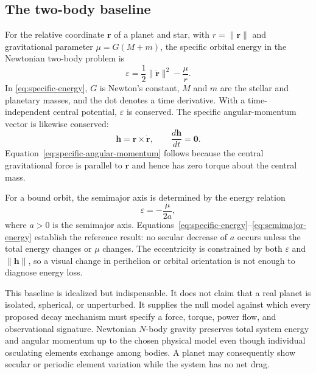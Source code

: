 \documentclass[10pt,conference]{IEEEtran}
\begin{document}
\subsection{The two-body baseline}

For the relative coordinate $\mathbf{r}$ of a planet and star, with $r=\lVert\mathbf{r}\rVert$ and gravitational parameter $\mu=G(M+m)$, the specific orbital energy in the Newtonian two-body problem is
\begin{equation}
\varepsilon=\frac{1}{2}\lVert\dot{\mathbf{r}}\rVert^2-\frac{\mu}{r}.
\label{eq:specific-energy}
\end{equation}
In \eqref{eq:specific-energy}, $G$ is Newton's constant, $M$ and $m$ are the stellar and planetary masses, and the dot denotes a time derivative. With a time-independent central potential, $\varepsilon$ is conserved. The specific angular-momentum vector is likewise conserved:
\begin{equation}
\mathbf{h}=\mathbf{r}\times\dot{\mathbf{r}}, \qquad \frac{d\mathbf{h}}{dt}=\mathbf{0}.
\label{eq:specific-angular-momentum}
\end{equation}
Equation~\eqref{eq:specific-angular-momentum} follows because the central gravitational force is parallel to $\mathbf{r}$ and hence has zero torque about the central mass.

For a bound orbit, the semimajor axis is determined by the energy relation
\begin{equation}
\varepsilon=-\frac{\mu}{2a},
\label{eq:semimajor-energy}
\end{equation}
where $a>0$ is the semimajor axis. Equations~\eqref{eq:specific-energy}--\eqref{eq:semimajor-energy} establish the reference result: no secular decrease of $a$ occurs unless the total energy changes or $\mu$ changes. The eccentricity is constrained by both $\varepsilon$ and $\lVert\mathbf{h}\rVert$, so a visual change in perihelion or orbital orientation is not enough to diagnose energy loss.

This baseline is idealized but indispensable. It does not claim that a real planet is isolated, spherical, or unperturbed. It supplies the null model against which every proposed decay mechanism must specify a force, torque, power flow, and observational signature. Newtonian $N$-body gravity preserves total system energy and angular momentum up to the chosen physical model even though individual osculating elements exchange among bodies. A planet may consequently show secular or periodic element variation while the system has no net drag.
\end{document}

